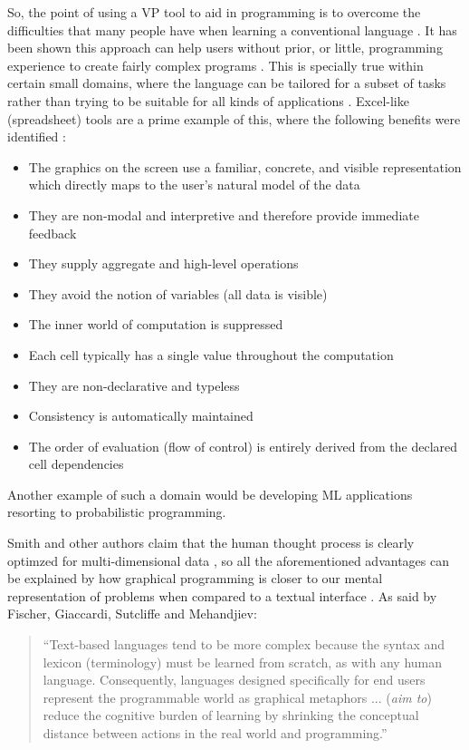 \begin{itemsize}
So, the point of using a VP tool to aid in programming is to overcome the
difficulties that many people have when learning a conventional language
\cite{Lewis1987}. It has been shown this approach can help users without prior, or little,
programming experience to create fairly complex programs \cite{Halbert1984}.
This is specially true within certain small domains, where the language can be
tailored for a subset of tasks rather than trying to be suitable for all kinds
of applications \cite{Kelleher2005}. Excel-like (spreadsheet) tools are a prime example of this, where the following
benefits were identified \cite{ambler1987forms}\cite{Lewis1987}:

\begin{itemize}
  \item The graphics on the screen use a familiar, concrete, and visible representation which
directly maps to the user’s natural model of the data
  \item They are non-modal and interpretive and therefore provide immediate feedback
  \item They supply aggregate and high-level operations
  \item They avoid the notion of variables (all data is visible)
  \item The inner world of computation is suppressed
  \item Each cell typically has a single value throughout the computation
  \item They are non-declarative and typeless
  \item Consistency is automatically maintained
  \item The order of evaluation (flow of control) is entirely derived from the declared cell dependencies
\end{itemize}

Another example of such a domain would be
developing ML applications resorting to probabilistic programming.

Smith and other authors claim that the human thought process is clearly optimzed
for multi-dimensional data \cite{smith1977pygmalion}\cite{Clarisse1986},
so all the aforementioned advantages can be explained by how graphical programming is closer
to our mental representation of problems when compared to a textual interface
\cite{Cardellini2002}. As said by Fischer, Giaccardi, Sutcliffe and Mehandjiev:

\begin{quote}
  ``Text-based languages tend to be more complex because the syntax and lexicon
  (terminology) must be learned from scratch, as with any human language.
  Consequently, languages designed specifically for end users represent the
  programmable world as graphical metaphors ... (\textit{aim to}) reduce the cognitive
  burden of learning by shrinking the conceptual distance between actions in
  the real world and programming.'' \cite{G2004}
\end{quote}


\end{itemsize}
